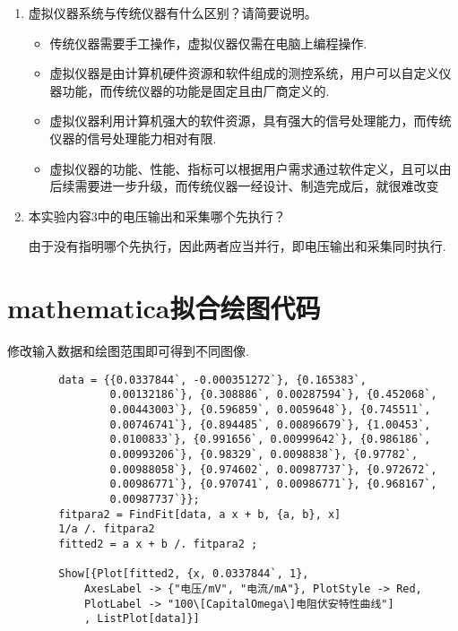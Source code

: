 \documentclass[11pt]{article}
\begin{document}
	\begin{enumerate}
		\item 虚拟仪器系统与传统仪器有什么区别？请简要说明。
		\begin{itemize}
			\item 传统仪器需要手工操作，虚拟仪器仅需在电脑上编程操作.
			\item 虚拟仪器是由计算机硬件资源和软件组成的测控系统，用户可以自定义仪器功能，而传统仪器的功能是固定且由厂商定义的.
			\item 虚拟仪器利用计算机强大的软件资源，具有强大的信号处理能力，而传统仪器的信号处理能力相对有限.
			\item 虚拟仪器的功能、性能、指标可以根据用户需求通过软件定义，且可以由后续需要进一步升级，而传统仪器一经设计、制造完成后，就很难改变
		\end{itemize}
		
		\item 本实验内容3中的电压输出和采集哪个先执行？
		
		由于没有指明哪个先执行，因此两者应当并行，即电压输出和采集同时执行.
	\end{enumerate}
	
	\newpage
	
	\appendix
	
	\section{mathematica拟合绘图代码}
	修改输入数据和绘图范围即可得到不同图像.
	\begin{lstlisting}
		data = {{0.0337844`, -0.000351272`}, {0.165383`, 
				0.00132186`}, {0.308886`, 0.00287594`}, {0.452068`, 
				0.00443003`}, {0.596859`, 0.0059648`}, {0.745511`, 
				0.00746741`}, {0.894485`, 0.00896679`}, {1.00453`, 
				0.0100833`}, {0.991656`, 0.00999642`}, {0.986186`, 
				0.00993206`}, {0.98329`, 0.0098838`}, {0.97782`, 
				0.00988058`}, {0.974602`, 0.00987737`}, {0.972672`, 
				0.00986771`}, {0.970741`, 0.00986771`}, {0.968167`, 
				0.00987737`}};
		fitpara2 = FindFit[data, a x + b, {a, b}, x]
		1/a /. fitpara2
		fitted2 = a x + b /. fitpara2 ;
		
		Show[{Plot[fitted2, {x, 0.0337844`, 1}, 
			AxesLabel -> {"电压/mV", "电流/mA"}, PlotStyle -> Red, 
			PlotLabel -> "100\[CapitalOmega\]电阻伏安特性曲线"]
			, ListPlot[data]}]
	\end{lstlisting}
	
\end{document}

